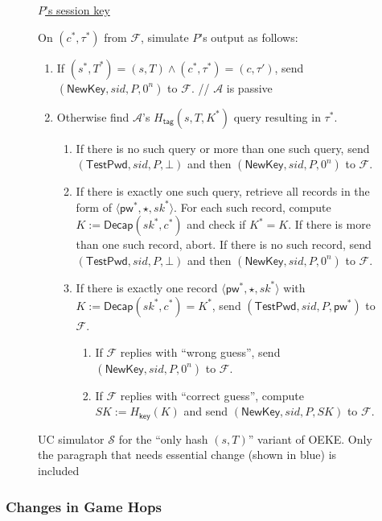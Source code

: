 \documentclass{article}
\theoremstyle{plain}
\theoremstyle{definition}
\theoremstyle{remark}
\newcommand{\adv}{\mathcal{A}}
\renewcommand{\sim}{\mathcal{S}}
\newcommand{\func}{\mathcal{F}}
\newcommand{\Decap}{\mathsf{Decap}}
\newcommand{\Hkey}{H_\mathsf{key}}
\newcommand{\Htag}{H_\mathsf{tag}}
\newcommand{\pw}{\mathsf{pw}}
\newcommand{\TestPwd}{\mathsf{TestPwd}}
\newcommand{\NewKey}{\mathsf{NewKey}}
\begin{document}
\begin{figure}[H]
\begin{framed}
\begin{small}
\underline{$P$'s session key}

\medskip
On $(c^*,\tau^*)$ from $\func$, simulate $P$'s output as follows:
\begin{enumerate}
  \item If $(s^*,T^*) = (s,T) \land (c^*,\tau^*) = (c,\tau')$, send $(\NewKey, sid, P, 0^n)$ to $\func$. \quad \textcolor[gray]{0.5}{// $\adv$ is passive}
  \item Otherwise find $\adv$'s {\color{blue}$\Htag(s,T,K^*)$} query resulting in $\tau^*$.
      \begin{enumerate}
        \item If there is no such query or more than one such query, send $(\TestPwd, sid, P, \bot)$ and then $(\NewKey, sid, P, 0^n)$ to $\func$.
        \item If there is exactly one such query, retrieve {\color{blue}all records in the form of $\langle\pw^*,\star,sk^*\rangle$}. {\color{blue}For each such record}, compute $K := \Decap(sk^*,c^*)$ and check if $K^* = K$. {\color{blue}If there is more than one such record, abort.} If there is no such record, send $(\TestPwd, sid, P, \bot)$ and then $(\NewKey, sid, P, 0^n)$ to $\func$.
        \item {\color{blue}If there is exactly one record $\langle\pw^*,\star,sk^*\rangle$ with $K := \Decap(sk^*,c^*) = K^*$}, send $(\TestPwd, sid, P, \pw^*)$ to $\func$.
            \begin{enumerate}
              \item If $\func$ replies with ``wrong guess'', send $(\NewKey, sid, P, 0^n)$ to $\func$.
              \item If $\func$ replies with ``correct guess'', compute $SK := \Hkey(K)$ and send $(\NewKey, sid, P, SK)$ to $\func$.
            \end{enumerate}
      \end{enumerate}
\end{enumerate}
\end{small}
\end{framed}
\caption{UC simulator $\sim$ for the ``only hash $(s,T)$'' variant of OEKE. Only the paragraph that needs essential change (shown in {\color{blue}blue}) is included}
\label{fig:oeke-sim-hash-st}
\end{figure}

\subsubsection{Changes in Game Hops}
\end{document}

